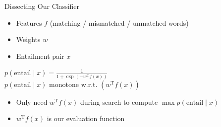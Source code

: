 \def\title{Dissecting Our Classifier}
\begin{frame}{\title}
\begin{itemize}
\item Features $f$ (matching / mismatched / unmatched words)
\item Weights $w$
\item Entailment pair $x$
\end{itemize}

\begin{center}
$p(\textrm{entail} \mid x) = \frac{1}{1 + \exp\left(-w^{\textrm{T}} f(x)\right)}$ \\
\pause
\vspace{3ex}
$p(\textrm{entail} \mid x)$ monotone w.r.t. $\left(w^{\textrm{T}} f(x)\right)$ \\
\end{center}
\pause
\vspace{1ex}

\begin{itemize}
\item Only need $w^{\textrm{T}} f(x)$ during search to compute $\max p(\textrm{entail} \mid x)$
\item $w^{\textrm{T}} f(x)$ is our evaluation function
\end{itemize}
\end{frame}

